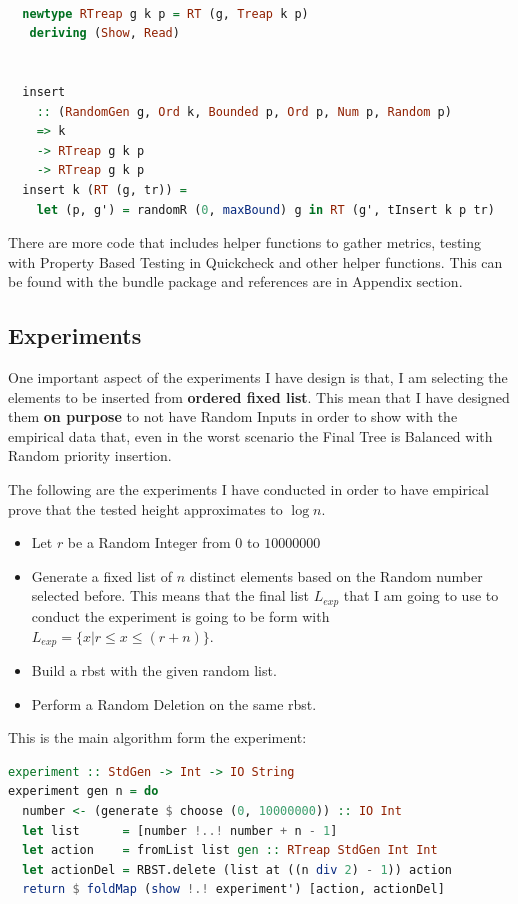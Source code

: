 \documentclass[12pt, a4paper]{article}
\begin{document}
\begin{lstlisting}[language=Haskell,title={\textbf{RandomBST.hs} - Random Treap Implementation with Insert function compose with underlying Treap}]

  newtype RTreap g k p = RT (g, Treap k p)
   deriving (Show, Read)


  insert
    :: (RandomGen g, Ord k, Bounded p, Ord p, Num p, Random p)
    => k
    -> RTreap g k p
    -> RTreap g k p
  insert k (RT (g, tr)) =
    let (p, g') = randomR (0, maxBound) g in RT (g', tInsert k p tr)

\end{lstlisting}

There are more code that includes helper functions to gather metrics, testing with Property Based Testing in Quickcheck and other helper functions. This can be found with the bundle package and references are in Appendix section.

\subsection{Experiments}
One important aspect of the experiments I have design is that, I am selecting the elements to be inserted from \textbf{ordered fixed list}. This mean that I have designed them \textbf{on purpose} to not have Random Inputs in order to show with the empirical data that, even in the worst scenario the Final Tree is Balanced with Random priority insertion.

The following are the experiments I have conducted in order to have empirical prove that the tested height approximates to $\log n$.

\begin{itemize}
  \item Let $r$ be a Random Integer from $0$ to $10000000$
  \item Generate a fixed list of $n$ distinct elements based on the Random number selected before. This means that the final list $L_{exp}$ that I am going to use to conduct the experiment is going to be form with $L_{exp} = \{ x | r \leq x \leq (r+n) \}$.
  \item Build a \acrshort{rbst} with the given random list.
  \item Perform a Random Deletion on the same \acrshort{rbst}.
\end{itemize}

This is the main algorithm form the experiment:

\begin{lstlisting}[language=Haskell,title={\textbf{Experiments.hs} - Experiment Algorithm}]
experiment :: StdGen -> Int -> IO String
experiment gen n = do
  number <- (generate $ choose (0, 10000000)) :: IO Int
  let list      = [number !..! number + n - 1]
  let action    = fromList list gen :: RTreap StdGen Int Int
  let actionDel = RBST.delete (list at ((n div 2) - 1)) action
  return $ foldMap (show !.! experiment') [action, actionDel]
\end{lstlisting}
\end{document}
